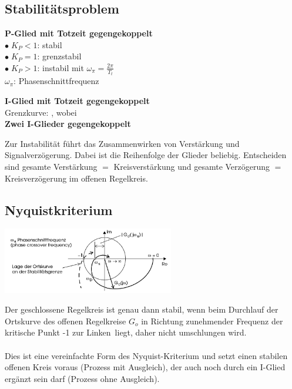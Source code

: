 
	\newpage

	\subsection{Stabilitätsproblem }
	\begin{multicols}{2}	
        
        \textbf{P-Glied mit Totzeit gegengekoppelt }\\
        	$\bullet \; K_P < 1$: stabil\\
        	$\bullet \; K_P = 1$: grenzstabil\\
        	$\bullet \; K_P > 1$: instabil mit $\omega_{\pi} = \frac{2\pi}{T_t}$\\
        	$\omega_\pi$: Phasenschnittfrequenz
        	
       	\columnbreak
        	
		\textbf{I-Glied mit Totzeit gegengekoppelt }\\
			Grenzkurve: , wobei \\
        
        \textbf{Zwei I-Glieder gegengekoppelt }\\
	\end{multicols}
	Zur Instabilität führt das Zusammenwirken von Verstärkung und Signalverzögerung. Dabei ist die Reihenfolge der Glieder beliebig. Entscheiden sind gesamte Verstärkung $=$ Kreisverstärkung und gesamte Verzögerung $=$ Kreisverzögerung im offenen Regelkreis.

	\subsection{Nyquistkriterium }
		\begin{minipage}{8cm}
			\includegraphics[width = 7.5cm]{./images/Nyquistkurve}
		\end{minipage}
		\begin{minipage}{10cm}
			Der geschlossene Regelkreis ist genau dann stabil, wenn beim Durchlauf der
			Ortskurve des offenen Regelkreise $G_o$ in Richtung zunehmender Frequenz der kritische Punkt -1 \glqq zur Linken\grqq\ liegt, daher nicht umschlungen wird. \\ \\ 
			Dies ist eine vereinfachte Form des Nyquist-Kriterium und setzt einen stabilen offenen Kreis voraus (Prozess mit Ausgleich), der auch noch durch ein I-Glied ergänzt sein darf (Prozess ohne Ausgleich).
		\end{minipage}
		 
